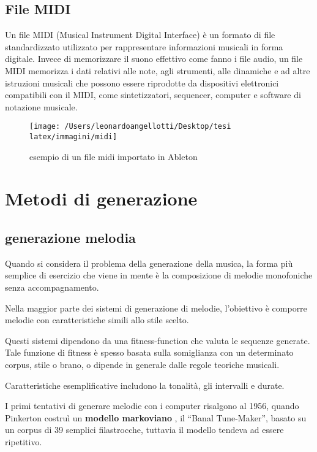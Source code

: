 \documentclass[a4paper,12pt]{report}
\begin{document}
\section{File MIDI}

Un file MIDI (Musical Instrument Digital Interface) è un formato di file standardizzato utilizzato per rappresentare informazioni musicali in forma digitale. 
Invece di memorizzare il suono effettivo come fanno i file audio, un file MIDI memorizza i dati relativi alle note, agli strumenti, alle dinamiche e ad altre istruzioni musicali che possono essere riprodotte da dispositivi elettronici compatibili con il MIDI, 
come sintetizzatori, sequencer, computer e software di notazione musicale.

\begin{figure}[h!]
    \centering
    \texttt{[image: /Users/leonardoangellotti/Desktop/tesi latex/immagini/midi]} 
    \caption{esempio di un file midi importato in Ableton}
    \label{fig:immagine}
\end{figure}

\chapter{Metodi di generazione}

\section{generazione melodia}

Quando si considera il problema della generazione della musica, la forma più semplice di esercizio che viene in mente è la composizione di melodie monofoniche senza accompagnamento.

Nella maggior parte dei sistemi di generazione di melodie, l'obiettivo è comporre melodie con caratteristiche simili allo stile scelto.

Questi sistemi dipendono da una fitness-function che valuta le sequenze generate.
Tale funzione di fitness è spesso basata sulla somiglianza con un determinato corpus, stile o brano, o dipende in generale dalle regole teoriche musicali.

Caratteristiche esemplificative includono la tonalità, gli intervalli e durate.

I primi tentativi di generare melodie con i computer risalgono al 1956, quando Pinkerton costruì un \textbf{modello markoviano} , il “Banal Tune-Maker”, basato su un corpus di 39 semplici filastrocche,
tuttavia il modello tendeva ad essere ripetitivo.
\end{document}
